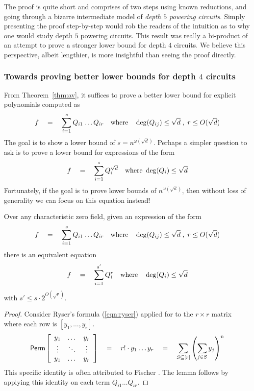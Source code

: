 The proof is quite short and comprises of two steps using known reductions, and going through a bizarre intermediate model of \emph{depth $5$ powering circuits}. Simply presenting the proof step-by-step would rob the readers of the intuition as to why one would study depth $5$ powering circuits. This result was really a bi-product of an attempt to prove a stronger lower bound for depth $4$ circuits. We believe this perspective, albeit lengthier, is more insightful than seeing the proof directly. 

\subsubsection{Towards proving better lower bounds for depth $4$ circuits}

From Theorem~\ref{thm:av}, it suffices to prove a better lower bound for explicit polynomials computed as
\begin{equation}\label{eqn:d4-LB}
f\quad = \quad \sum_{i=1}^s Q_{i1}\dots Q_{ir} \quad\text{where}\quad \deg(Q_{ij})\leq \sqrt{d}\;,\; r\leq O(\sqrt{d})
\end{equation}
The goal is to show a lower bound of $s = n^{\omega(\sqrt{d})}$. Perhaps a simpler question to ask is to prove a lower bound for expressions of the form
\begin{equation}\label{eqn:d4pow-LB}
f\quad = \quad \sum_{i=1}^s Q_{i}^{\sqrt{d}} \quad\text{where }\deg(Q_i)\leq \sqrt{d}
\end{equation}
Fortunately, if the goal is to prove lower bounds of $n^{\omega(\sqrt{d})}$, then without loss of generality we can focus on this equation instead! 

\begin{lemma}\label{lem:fischer}
Over any characteristic zero field, given an expression of the form 
\[
f\quad = \quad \sum_{i=1}^s Q_{i1}\dots Q_{ir} \quad\text{where}\quad \deg(Q_{ij})\leq \sqrt{d}\;,\; r\leq O(\sqrt{d})
\]
there is an equivalent equation
\[
f\quad = \quad \sum_{i=1}^{s'} Q_{i}^r\quad\text{where}\quad \deg(Q_{i})\leq \sqrt{d}
\]
with $s' \leq s \cdot 2^{O(\sqrt{r})}$. 
\end{lemma}
\begin{proof}
Consider Ryser's formula (\ref{eqn:ryser}) applied for to the $r\times r$ matrix where each row is $[y_1,\dots, y_r]$. 
\[
\mathsf{Perm} \left[\begin{array}{ccc} y_1 & \dots & y_r\\ \vdots & \ddots & \vdots \\ y_1 & \dots & y_r\end{array}\right] \quad = \quad r! \cdot y_1\dots y_r \quad = \quad \sum_{S\subseteq [r]} \left(\sum_{j\in S} y_j\right)^n
\]
This specific identity is often attributed to Fischer \cite{fischer}. The lemma follows by applying this identity on each term $Q_{i1}\dots Q_{ir}$. 
\end{proof}

